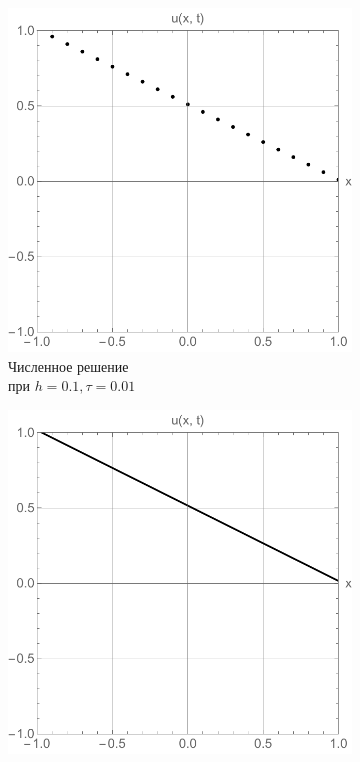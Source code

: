 \documentclass[12pt, a4paper]{article}
\begin{document}
\begin{figure}[!hp]
	\centering
	\begin{subfigure}[t]{0.32\textwidth}
		\centering
		\includegraphics[width=\textwidth]{res5_2}
		\caption{Численное решение  \\при $h = 0.1, \tau = 0.01$ }
		\label{test1}
	\end{subfigure}
	\hfill
	\begin{subfigure}[t]{0.32\textwidth}
		\centering
		\includegraphics[width=\textwidth]{res5_1}

\end{subfigure}
\end{figure}
\end{document}
